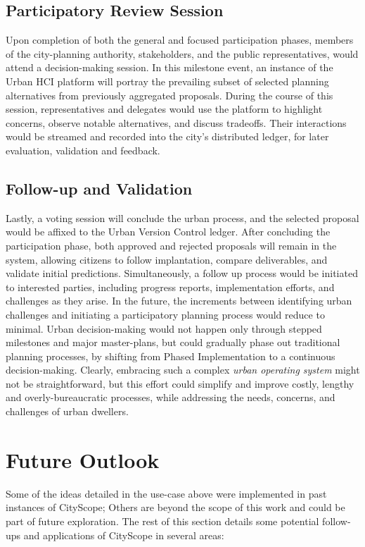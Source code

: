 {{      \subsection{Participatory Review Session}
      {
          Upon completion of both the general and focused participation phases, members of the city-planning authority, stakeholders, and the public representatives, would attend a decision-making session. In this milestone event, an instance of the Urban HCI platform will portray the prevailing subset of selected planning alternatives from previously aggregated proposals. During the course of this session, representatives and delegates would use the platform to highlight concerns, observe notable alternatives, and discuss tradeoffs. Their interactions would be streamed and recorded into the city's distributed ledger, for later evaluation, validation and feedback.
      }

      \subsection{Follow-up and Validation}
      {
          Lastly, a voting session will conclude the urban process, and the selected proposal would be affixed to the Urban Version Control ledger. After concluding the participation phase, both approved and rejected proposals will remain in the system, allowing citizens to follow implantation, compare deliverables, and validate initial predictions. Simultaneously, a follow up process would be initiated to interested parties, including progress reports, implementation efforts, and challenges as they arise.
          \newline
          In the future, the increments between identifying urban challenges and initiating a participatory planning process would reduce to minimal. Urban decision-making would not happen only through stepped milestones and major master-plans, but could gradually phase out traditional planning processes, by shifting from Phased Implementation to a continuous decision-making. Clearly, embracing such a complex \textit{urban operating system} might not be straightforward, but this effort could simplify and improve costly, lengthy and overly-bureaucratic processes, while addressing the needs, concerns, and challenges of urban dwellers.
      }
     }

    \section{Future Outlook}
     {
      Some of the ideas detailed in the use-case above were implemented in past instances of CityScope; Others are beyond the scope of this work and could be part of future exploration. The rest of this section details some potential follow-ups and applications of CityScope in several areas:

}}
